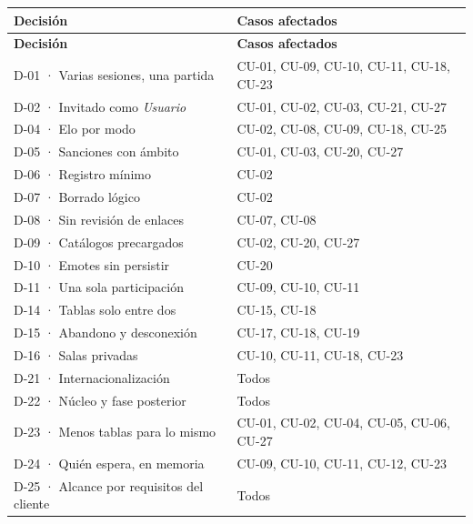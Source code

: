 \begin{center}\small
\begin{longtable}{|L{0.308\textwidth}|L{0.592\textwidth}|}
\hline
\textbf{Decisión} & \textbf{Casos afectados} \\ \hline
\endfirsthead
\hline
\textbf{Decisión} & \textbf{Casos afectados} \\ \hline
\endhead
\mbox{D-01} · Varias sesiones, una partida & \mbox{CU-01}, \mbox{CU-09}, \mbox{CU-10}, \mbox{CU-11}, \mbox{CU-18}, \mbox{CU-23} \\ \hline
\mbox{D-02} · Invitado como \textit{Usuario} & \mbox{CU-01}, \mbox{CU-02}, \mbox{CU-03}, \mbox{CU-21}, \mbox{CU-27} \\ \hline
\mbox{D-04} · Elo por modo & \mbox{CU-02}, \mbox{CU-08}, \mbox{CU-09}, \mbox{CU-18}, \mbox{CU-25} \\ \hline
\mbox{D-05} · Sanciones con ámbito & \mbox{CU-01}, \mbox{CU-03}, \mbox{CU-20}, \mbox{CU-27} \\ \hline
\mbox{D-06} · Registro mínimo & \mbox{CU-02} \\ \hline
\mbox{D-07} · Borrado lógico & \mbox{CU-02} \\ \hline
\mbox{D-08} · Sin revisión de enlaces & \mbox{CU-07}, \mbox{CU-08} \\ \hline
\mbox{D-09} · Catálogos precargados & \mbox{CU-02}, \mbox{CU-20}, \mbox{CU-27} \\ \hline
\mbox{D-10} · Emotes sin persistir & \mbox{CU-20} \\ \hline
\mbox{D-11} · Una sola participación & \mbox{CU-09}, \mbox{CU-10}, \mbox{CU-11} \\ \hline
\mbox{D-14} · Tablas solo entre dos & \mbox{CU-15}, \mbox{CU-18} \\ \hline
\mbox{D-15} · Abandono y desconexión & \mbox{CU-17}, \mbox{CU-18}, \mbox{CU-19} \\ \hline
\mbox{D-16} · Salas privadas & \mbox{CU-10}, \mbox{CU-11}, \mbox{CU-18}, \mbox{CU-23} \\ \hline
\mbox{D-21} · Internacionalización & Todos \\ \hline
\mbox{D-22} · Núcleo y fase posterior & Todos \\ \hline
\mbox{D-23} · Menos tablas para lo mismo & \mbox{CU-01}, \mbox{CU-02}, \mbox{CU-04}, \mbox{CU-05}, \mbox{CU-06}, \mbox{CU-27} \\ \hline
\mbox{D-24} · Quién espera, en memoria & \mbox{CU-09}, \mbox{CU-10}, \mbox{CU-11}, \mbox{CU-12}, \mbox{CU-23} \\ \hline
\mbox{D-25} · Alcance por requisitos del cliente & Todos \\ \hline

\end{longtable}
\end{center}
